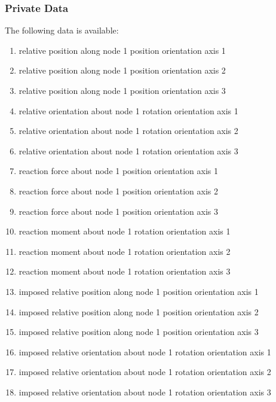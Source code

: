 \subsubsection{Private Data}
The following data is available:
\begin{enumerate}
\item {} relative position along node 1 position orientation axis 1
\item {} relative position along node 1 position orientation axis 2
\item {} relative position along node 1 position orientation axis 3

\item {} relative orientation about node 1 rotation orientation axis 1
\item {} relative orientation about node 1 rotation orientation axis 2
\item {} relative orientation about node 1 rotation orientation axis 3

\item {} reaction force about node 1 position orientation axis 1
\item {} reaction force about node 1 position orientation axis 2
\item {} reaction force about node 1 position orientation axis 3

\item {} reaction moment about node 1 rotation orientation axis 1
\item {} reaction moment about node 1 rotation orientation axis 2
\item {} reaction moment about node 1 rotation orientation axis 3

\item {} imposed relative position along node 1 position orientation axis 1
\item {} imposed relative position along node 1 position orientation axis 2
\item {} imposed relative position along node 1 position orientation axis 3

\item {} imposed relative orientation about node 1 rotation orientation axis 1
\item {} imposed relative orientation about node 1 rotation orientation axis 2
\item {} imposed relative orientation about node 1 rotation orientation axis 3


\end{enumerate}
